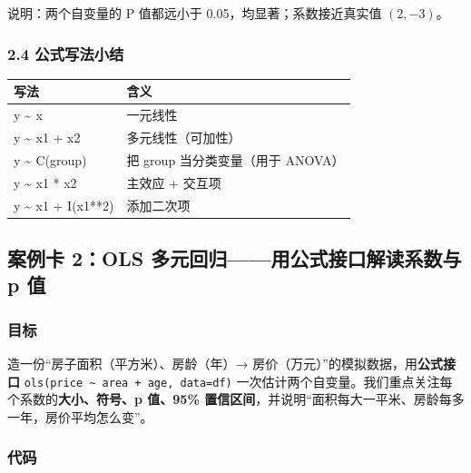 说明：两个自变量的 P 值都远小于 0.05，均显著；系数接近真实值
\((2, -3)\)。

\subsubsection{2.4
公式写法小结}\label{ux516cux5f0fux5199ux6cd5ux5c0fux7ed3}

{\def\LTcaptype{none} %
\begin{longtable}[]{@{}ll@{}}
\toprule\noalign{}
写法 & 含义 \\
\midrule\noalign{}
\endhead
\bottomrule\noalign{}
\endlastfoot
y \textasciitilde{} x & 一元线性 \\
y \textasciitilde{} x1 + x2 & 多元线性（可加性） \\
y \textasciitilde{} C(group) & 把 group 当分类变量（用于 ANOVA） \\
y \textasciitilde{} x1 * x2 & 主效应 + 交互项 \\
y \textasciitilde{} x1 + I(x1**2) & 添加二次项 \\
\end{longtable}
}

\subsection{案例卡 2：OLS 多元回归------用公式接口解读系数与 p
值}\label{ux6848ux4f8bux5361-2ols-ux591aux5143ux56deux5f52ux7528ux516cux5f0fux63a5ux53e3ux89e3ux8bfbux7cfbux6570ux4e0e-p-ux503c}

\subsubsection{目标}\label{ux76eeux6807-28}

造一份``房子面积（平方米）、房龄（年）→
房价（万元）''的模拟数据，用\textbf{公式接口}
\texttt{ols(\textquotesingle{}price\ \textasciitilde{}\ area\ +\ age\textquotesingle{},\ data=df)}
一次估计两个自变量。我们重点关注每个系数的\textbf{大小、符号、p 值、95\%
置信区间}，并说明``面积每大一平米、房龄每多一年，房价平均怎么变''。

\subsubsection{代码}\label{ux4ee3ux7801-29}

